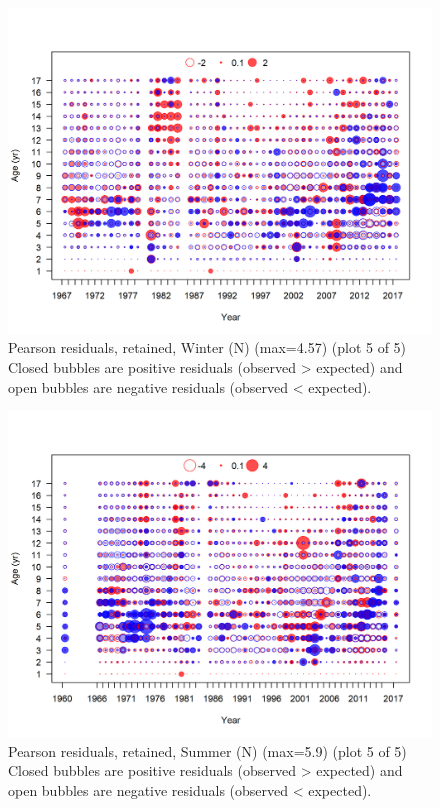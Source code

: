 \documentclass[12pt,]{article}
\begin{document}
\FloatBarrier

\begin{figure}
\centering
\includegraphics{r4ss/plots_mod1/comp_agefit_residsflt1mkt2_page5.png}
\caption{Pearson residuals, retained, Winter (N) (max=4.57) (plot 5 of
5)\\
Closed bubbles are positive residuals (observed \textgreater{} expected)
and open bubbles are negative residuals (observed \textless{} expected).
\label{fig:wn_age_pearson}}
\end{figure}

\begin{figure}
\centering
\includegraphics{r4ss/plots_mod1/comp_agefit_residsflt2mkt2_page5.png}
\caption{Pearson residuals, retained, Summer (N) (max=5.9) (plot 5 of
5)\\
Closed bubbles are positive residuals (observed \textgreater{} expected)
and open bubbles are negative residuals (observed \textless{} expected).
\label{fig:sn_age_pearson}}
\end{figure}
\end{document}
